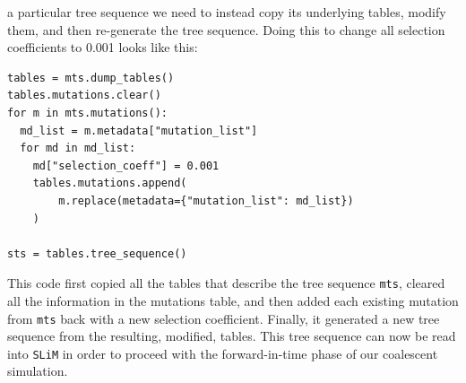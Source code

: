 \documentclass[12pt]{article}
\newcommand{\slim}[0]{\texttt{SLiM}\xspace}
\begin{document}
a particular tree sequence we need to instead copy its underlying tables, modify them,
and then re-generate the tree sequence.
Doing this to change all selection coefficients to 0.001 looks like this:
\begin{verbatim}
tables = mts.dump_tables()
tables.mutations.clear()
for m in mts.mutations():
  md_list = m.metadata["mutation_list"]
  for md in md_list:
    md["selection_coeff"] = 0.001
    tables.mutations.append(
        m.replace(metadata={"mutation_list": md_list})
    )

sts = tables.tree_sequence()
\end{verbatim}
This code first copied all the tables that describe the tree sequence \verb|mts|, cleared all the
information in the mutations table, and then added each existing mutation from \verb|mts| back with a new selection
coefficient. Finally, it generated a new tree sequence from the resulting, modified, tables.
This tree sequence can now be read into \slim in order to proceed with the forward-in-time phase of our coalescent simulation.
\end{document}
